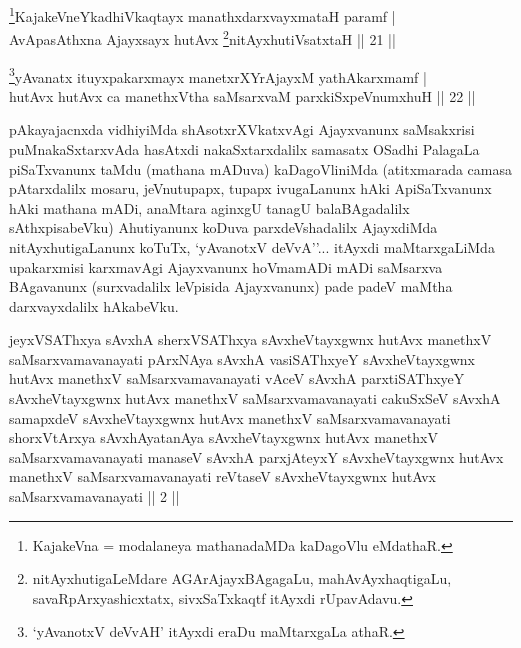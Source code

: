 \begin{shl}
\footnote{KajakeVna = modalaneya mathanadaMDa kaDagoVlu eMdathaR.}KajakeVneYkadhiVkaqtayx manathxdarxvayxmataH paramf | \\
AvApasAthxna Ajayxsayx hutAvx \footnote{nitAyxhutigaLeMdare AGArAjayxBAgagaLu, mahAvAyxhaqtigaLu, savaRpArxyashicxtatx, sivxSaTxkaqtf itAyxdi rUpavAdavu.}nitAyxhutiVsatxtaH \hfill|| 21 ||
\end{shl}



\begin{shl}
\footnote{`yAvanotxV deVvAH' itAyxdi eraDu maMtarxgaLa athaR.}yAvanatx ituyxpakarxmayx manetxrXYrAjayxM yathAkarxmamf | \\
hutAvx hutAvx ca manethxV\s tha saMsarxvaM parxkiSxpeVnumxhuH \hfill|| 22 || 
\end{shl}

\begin{artha}
pAkayajacnxda vidhiyiMda shAsotxrXVkatxvAgi Ajayxvanunx saMsakxrisi puMnakaSxtarxvAda hasAtxdi nakaSxtarxdalilx samasatx OSadhi PalagaLa piSaTxvanunx taMdu (mathana mADuva) kaDagoVliniMda (atitxmarada camasa pAtarxdalilx mosaru, jeVnutupapx, tupapx ivugaLanunx hAki ApiSaTxvanunx hAki mathana mADi, anaMtara aginxgU tanagU balaBAgadalilx sAthxpisabeVku) Ahutiyanunx koDuva parxdeVshadalilx AjayxdiMda nitAyxhutigaLanunx koTuTx, `yAvanotxV deVvA''... itAyxdi maMtarxgaLiMda upakarxmisi karxmavAgi Ajayxvanunx hoVmamADi mADi saMsarxva BAgavanunx (surxvadalilx leVpisida Ajayxvanunx) pade padeV maMtha darxvayxdalilx hAkabeVku.
\end{artha}

\begin{kandikeshl}
jeyxVSAThxya sAvxhA sherxVSAThxya sAvxheVtayxgwnx hutAvx manethxV saMsarxvamavanayati pArxNAya sAvxhA vasiSAThxyeY sAvxheVtayxgwnx hutAvx manethxV saMsarxvamavanayati vAceV sAvxhA parxtiSAThxyeY sAvxheVtayxgwnx hutAvx manethxV saMsarxvamavanayati cakuSxSeV sAvxhA samapxdeV sAvxheVtayxgwnx hutAvx manethxV saMsarxvamavanayati shorxVtArxya sAvxhAyatanAya sAvxheVtayxgwnx hutAvx manethxV saMsarxvamavanayati manaseV sAvxhA parxjAteyxY sAvxheVtayxgwnx hutAvx manethxV saMsarxvamavanayati reVtaseV sAvxheVtayxgwnx hutAvx saMsarxvamavanayati || 2 ||
\end{kandikeshl}

